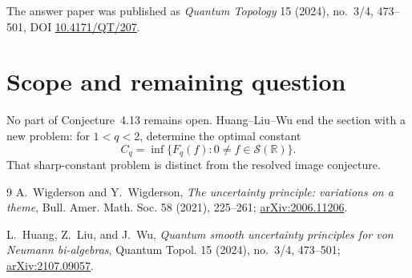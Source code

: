 \documentclass[11pt]{article}
\newcommand{\R}{\mathbb R}
\newcommand{\Sclass}{\mathcal S}
\begin{document}
The answer paper was published as \emph{Quantum Topology} 15 (2024), no.~3/4,
473--501, DOI \href{https://doi.org/10.4171/QT/207}{10.4171/QT/207}.

\section*{Scope and remaining question}

No part of Conjecture~4.13 remains open.  Huang--Liu--Wu end the section with
a new problem: for $1<q<2$, determine the optimal constant
\[
 C_q=\inf\{F_q(f):0\neq f\in\Sclass(\R)\}.
\]
That sharp-constant problem is distinct from the resolved image conjecture.

\begin{thebibliography}{9}
A.~Wigderson and Y.~Wigderson,
\emph{The uncertainty principle: variations on a theme},
Bull. Amer. Math. Soc. 58 (2021), 225--261;
\href{https://arxiv.org/abs/2006.11206}{arXiv:2006.11206}.

L.~Huang, Z.~Liu, and J.~Wu,
\emph{Quantum smooth uncertainty principles for von Neumann bi-algebras},
Quantum Topol. 15 (2024), no.~3/4, 473--501;
\href{https://arxiv.org/abs/2107.09057}{arXiv:2107.09057}.
\end{thebibliography}
\end{document}

